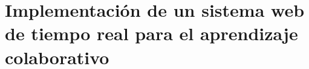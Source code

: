 %

\section{Implementación de un sistema web de tiempo real para el aprendizaje colaborativo}

\section{} 